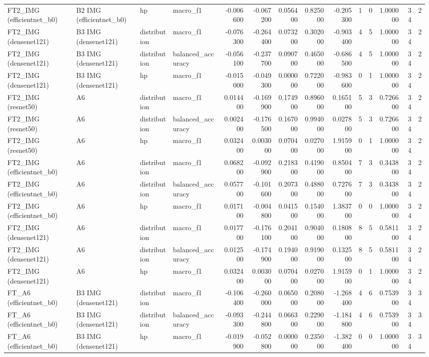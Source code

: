 \begin{table}
\begin{tabular}{llllrrrrrrrrrr}
FT2\_IMG (efficientnet\_b0) & B2 IMG (efficientnet\_b0) & hp & macro\_f1 & -0.006600 & -0.067200 & 0.056400 & 0.825000 & -0.205300 & 1 & 0 & 1.000000 & 34 & 2 \\
FT2\_IMG (densenet121) & B3 IMG (densenet121) & distribution & macro\_f1 & -0.076300 & -0.264400 & 0.073200 & 0.302000 & -0.903400 & 4 & 5 & 1.000000 & 34 & 2 \\
FT2\_IMG (densenet121) & B3 IMG (densenet121) & distribution & balanced\_accuracy & -0.056100 & -0.237700 & 0.090700 & 0.465000 & -0.686500 & 4 & 5 & 1.000000 & 34 & 2 \\
FT2\_IMG (densenet121) & B3 IMG (densenet121) & hp & macro\_f1 & -0.015000 & -0.049300 & 0.000000 & 0.722000 & -0.983600 & 0 & 1 & 1.000000 & 34 & 2 \\
FT2\_IMG (resnet50) & A6 & distribution & macro\_f1 & 0.014400 & -0.169900 & 0.174900 & 0.896000 & 0.165100 & 5 & 3 & 0.726600 & 34 & 2 \\
FT2\_IMG (resnet50) & A6 & distribution & balanced\_accuracy & 0.002400 & -0.176500 & 0.167000 & 0.994000 & 0.027800 & 5 & 3 & 0.726600 & 34 & 2 \\
FT2\_IMG (resnet50) & A6 & hp & macro\_f1 & 0.032400 & 0.003000 & 0.070400 & 0.027000 & 1.915900 & 0 & 1 & 1.000000 & 34 & 2 \\
FT2\_IMG (efficientnet\_b0) & A6 & distribution & macro\_f1 & 0.068200 & -0.092900 & 0.218300 & 0.419000 & 0.850400 & 7 & 3 & 0.343800 & 34 & 2 \\
FT2\_IMG (efficientnet\_b0) & A6 & distribution & balanced\_accuracy & 0.057700 & -0.101600 & 0.207300 & 0.488000 & 0.727600 & 7 & 3 & 0.343800 & 34 & 2 \\
FT2\_IMG (efficientnet\_b0) & A6 & hp & macro\_f1 & 0.017100 & -0.004800 & 0.041500 & 0.154000 & 1.383700 & 0 & 0 & 1.000000 & 34 & 2 \\
FT2\_IMG (densenet121) & A6 & distribution & macro\_f1 & 0.017700 & -0.176100 & 0.204100 & 0.904000 & 0.180800 & 8 & 5 & 0.581100 & 34 & 2 \\
FT2\_IMG (densenet121) & A6 & distribution & balanced\_accuracy & 0.012500 & -0.174900 & 0.194000 & 0.919000 & 0.132500 & 8 & 5 & 0.581100 & 34 & 2 \\
FT2\_IMG (densenet121) & A6 & hp & macro\_f1 & 0.032400 & 0.003000 & 0.070400 & 0.027000 & 1.915900 & 0 & 1 & 1.000000 & 34 & 2 \\
FT\_A6 (efficientnet\_b0) & B3 IMG (densenet121) & distribution & macro\_f1 & -0.106400 & -0.260000 & 0.065000 & 0.208000 & -1.268400 & 4 & 6 & 0.753900 & 34 & 3 \\
FT\_A6 (efficientnet\_b0) & B3 IMG (densenet121) & distribution & balanced\_accuracy & -0.093300 & -0.244800 & 0.066300 & 0.229000 & -1.184800 & 4 & 6 & 0.753900 & 34 & 3 \\
FT\_A6 (efficientnet\_b0) & B3 IMG (densenet121) & hp & macro\_f1 & -0.019900 & -0.052800 & 0.000000 & 0.235000 & -1.382400 & 0 & 0 & 1.000000 & 34 & 3 \\
\bottomrule
\end{tabular}
\end{table}
